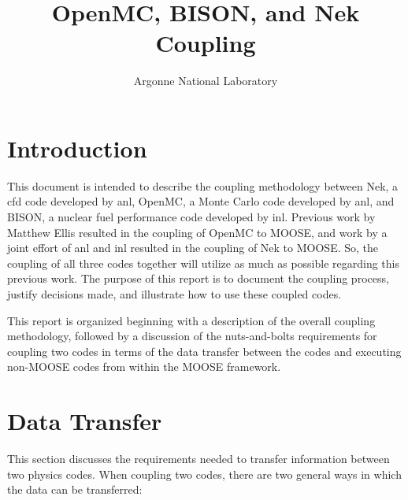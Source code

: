 \documentclass[10pt]{article}
\numberwithin{equation}{section} %
\begin{document}
\title{OpenMC, BISON, and Nek Coupling}
\author{Argonne National Laboratory}
\maketitle

\tableofcontents

\clearpage

\section{Introduction}

This document is intended to describe the coupling methodology between Nek, a \gls{cfd} code developed by \gls{anl}, OpenMC, a Monte Carlo code developed by \gls{anl}, and BISON, a nuclear fuel performance code developed by \gls{inl}. Previous work by Matthew Ellis resulted in the coupling of OpenMC to MOOSE, and work by a joint effort of \gls{anl} and \gls{inl} resulted in the coupling of Nek to MOOSE. So, the coupling of all three codes together will utilize as much as possible regarding this previous work. The purpose of this report is to document the coupling process, justify decisions made, and illustrate how to use these coupled codes.

This report is organized beginning with a description of the overall coupling methodology, followed by a discussion of the nuts-and-bolts requirements for coupling two codes in terms of the data transfer between the codes and executing non-MOOSE codes from within the MOOSE framework.

\section{Data Transfer}

This section discusses the requirements needed to transfer information between two physics codes. When coupling two codes, there are two general ways in which the data can be transferred:
\end{document}
